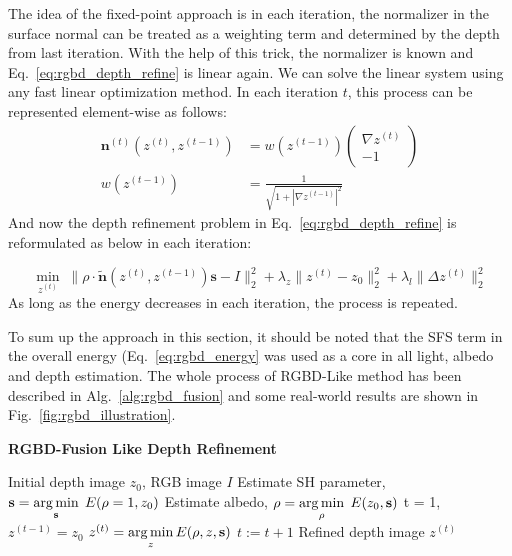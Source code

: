 The idea of the fixed-point approach is in each iteration, the normalizer in the surface normal can be treated as a weighting term and determined by the depth from last iteration.
With the help of this trick, the normalizer is known and Eq.~\ref{eq:rgbd_depth_refine} is linear again.
We can solve the linear system using any fast linear optimization method.
In each iteration $t$, this process can be represented element-wise as follows:
\begin{equation}
	\begin{split}
		\mathbf{n}^{(t)}(z^{(t)}, z^{(t-1)}) &= w(z^{(t-1)})
		\begin{pmatrix} 
			 \nabla z^{(t)}\\ 
			 -1
	         \end{pmatrix}\\
	         w(z^{(t-1)}) &=  \frac{1}{\sqrt{1 + |\nabla z^{(t-1)}|^2}}
	\end{split}
\end{equation}
And now the depth refinement problem in Eq.~\ref{eq:rgbd_depth_refine} is reformulated as below in each iteration:

\begin{equation}\label{eq:rgbd_depth_refine2}
	\min_{z^{(t)}} \; \lVert \rho \cdot \tilde{\mathbf{n}}(z^{(t)}, z^{(t-1)}) \mathbf{s} -I\rVert^2_2 + \lambda_z \lVert z^{(t)} - z_0\rVert^2_2 + \lambda_l \lVert \Delta z^{(t)} \rVert^2_2
\end{equation}
As long as the energy decreases in each iteration, the process is repeated.

To sum up the approach in this section, it should be noted that the SFS term in the overall energy (Eq.~\ref{eq:rgbd_energy} was used as a core in all light, albedo and depth estimation.
The whole process of RGBD-Like method has been described in Alg.~\ref{alg:rgbd_fusion} and some real-world results are shown in Fig.~\ref{fig:rgbd_illustration}.



\begin{algorithm}[!htbp]
	\begin{algorithmic}[1]
  		\caption{\textbf{RGBD-Fusion Like Depth Refinement}}
		\label{alg:rgbd_fusion}
		 \renewcommand{\algorithmicrequire}{\textbf{Input:}}
		 \renewcommand{\algorithmicensure}{\textbf{Output:}}
		 \REQUIRE Initial depth image $z_0$, RGB image $I$
		 \vspace{1.8mm}
		 \STATE Estimate SH parameter, $\mathbf{s} = \operatorname*{arg\,min} \limits_{\mathbf{s}} \; E(\rho = 1, z_0)$ 
		 \STATE Estimate albedo, $\rho = \operatorname*{arg\,min} \limits_{\rho} \; E(z_0, \mathbf{s})$ 
		 \STATE t = 1, $z^{(t-1)} = z_0$
		 \vspace{1.8mm}
		   \vspace{1.8mm}
			  \STATE $z^{(t)} = \operatorname*{arg\,min} \limits_{z} E(\rho, z, \mathbf{s})$ 
		          \STATE $t := t + 1$
		 \vspace{1.8mm}
		  \ENDWHILE
		  \ENSURE  Refined depth image $z^{(t)}$
	\end{algorithmic}
\end{algorithm}

